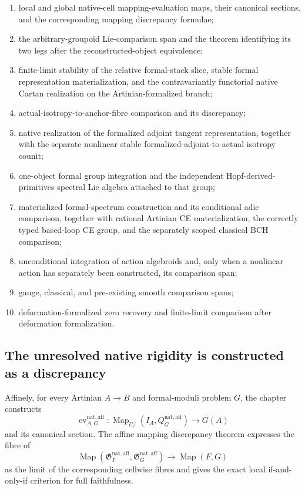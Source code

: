 \begin{enumerate}
    \item local and global native-cell mapping-evaluation maps, their canonical
    sections, and the corresponding mapping discrepancy formulae;
    \item the arbitrary-groupoid Lie-comparison span and the theorem identifying
    its two legs after the reconstructed-object equivalence;
    \item finite-limit stability of the relative formal-stack slice, stable
    formal representation materialization, and the contravariantly functorial
    native Cartan realization on the Artinian-formalized branch;
    \item actual-isotropy-to-anchor-fibre comparison and its discrepancy;
    \item native realization of the formalized adjoint tangent representation,
    together with the separate nonlinear stable formalized-adjoint-to-actual
    isotropy counit;
    \item one-object formal group integration and the independent
    Hopf-derived-primitives spectral Lie algebra attached to that group;
    \item materialized formal-spectrum construction and its conditional adic comparison,
    together with rational Artinian CE materialization, the correctly typed
    based-loop CE group, and the separately scoped classical BCH comparison;
    \item unconditional integration of action algebroids and, only when a
    nonlinear action has separately been constructed, its comparison span;
    \item gauge, classical, and pre-existing smooth comparison spans;
    \item deformation-formalized zero recovery and finite-limit comparison
    after deformation formalization.
\end{enumerate}

\subsection{The unresolved native rigidity is constructed as a discrepancy}

Affinely, for every Artinian $A\to B$ and formal-moduli problem $G$, the
chapter constructs
\[
    \operatorname{ev}^{\mathrm{nat,aff}}_{A,G}:
    \operatorname{Map}_{U/}(I_A,Q_G^{\mathrm{nat,aff}})
    \longrightarrow
    G(A)
\]
and its canonical section.  The affine mapping discrepancy theorem expresses
the fibre of
\[
    \operatorname{Map}
    (\mathfrak G_F^{\mathrm{nat,aff}},\mathfrak G_G^{\mathrm{nat,aff}})
    \longrightarrow
    \operatorname{Map}(F,G)
\]
as the limit of the corresponding cellwise fibres and gives the exact local
if-and-only-if criterion for full faithfulness.

